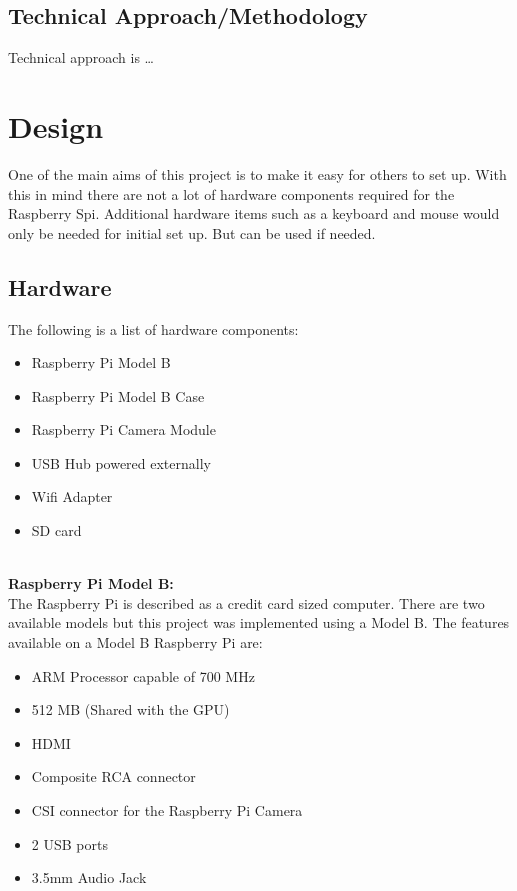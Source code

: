 \documentclass[]{report}
\begin{document}
\section{Technical Approach/Methodology}
\label{sec:tech}
Technical approach is \ldots
% 
\chapter{Design}
\label{ch:design}
	One of the main aims of this project is to make it easy for others to set up. With this in mind there are not a lot of hardware components required for the Raspberry Spi. Additional hardware items such as a keyboard and mouse would only be needed for initial set up. But can be used if needed. \\
	
\section{Hardware}	
\label{sec:hardware}

The following is a list of hardware components:\\
\begin{itemize}
  \item Raspberry Pi Model B\\
  \item Raspberry Pi Model B Case\\
  \item Raspberry Pi Camera Module\\
  \item USB Hub powered externally\\
  \item Wifi Adapter\\
  \item SD card\\
\end{itemize} 

\noindent\\
{\bf Raspberry Pi Model B:} \\
\break
The Raspberry Pi is described as a credit card sized computer. There are two available models but this project was implemented using a Model B. The features available on a Model B Raspberry Pi are:
\begin{itemize}
  \item ARM Processor capable of 700 MHz\\
  \item 512 MB (Shared with the GPU)\\
  \item HDMI\\
  \item Composite RCA connector\\
  \item CSI connector for the Raspberry Pi Camera\\
  \item 2 USB ports\\
  \item 3.5mm Audio Jack\\
\end{itemize}
  
\end{document}
